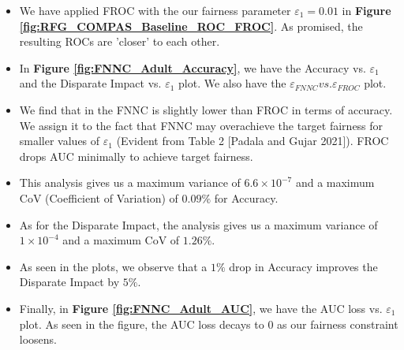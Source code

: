 \documentclass{article}
\begin{document}
\begin{itemize}
    \item We have applied FROC with the our fairness parameter $\varepsilon_1 = 0.01$ in \textbf{Figure \ref{fig:RFG_COMPAS_Baseline_ROC_FROC}}. As promised, the resulting ROCs are 'closer' to each other.
    \item In \textbf{Figure \ref{fig:FNNC_Adult_Accuracy}}, we have the Accuracy vs. $\varepsilon_1$ and the Disparate Impact vs. $\varepsilon_1$ plot. We also have the $\varepsilon_{FNNC} vs. \varepsilon_{FROC}$ plot.
    \item We find that in the FNNC is slightly lower than FROC in terms of accuracy. We assign it to the fact that FNNC may overachieve the target fairness for smaller values of $\varepsilon_1$ (Evident from Table 2 [Padala and Gujar 2021]). FROC drops AUC minimally to achieve target fairness.
    \item This analysis gives us a maximum variance of $6.6\times10^{-7}$ and a maximum CoV (Coefficient of Variation) of $0.09\%$ for Accuracy.
    \item As for the Disparate Impact, the analysis gives us a maximum variance of $1\times10^{-4}$ and a maximum CoV of $1.26\%$.
    \item As seen in the plots, we observe that a $1\%$ drop in Accuracy improves the Disparate Impact by $5\%$.
    \item Finally, in \textbf{Figure \ref{fig:FNNC_Adult_AUC}}, we have the AUC loss vs. $\varepsilon_1$ plot. As seen in the figure, the AUC loss decays to $0$ as our fairness constraint loosens.
\end{itemize}



        
\end{document}
